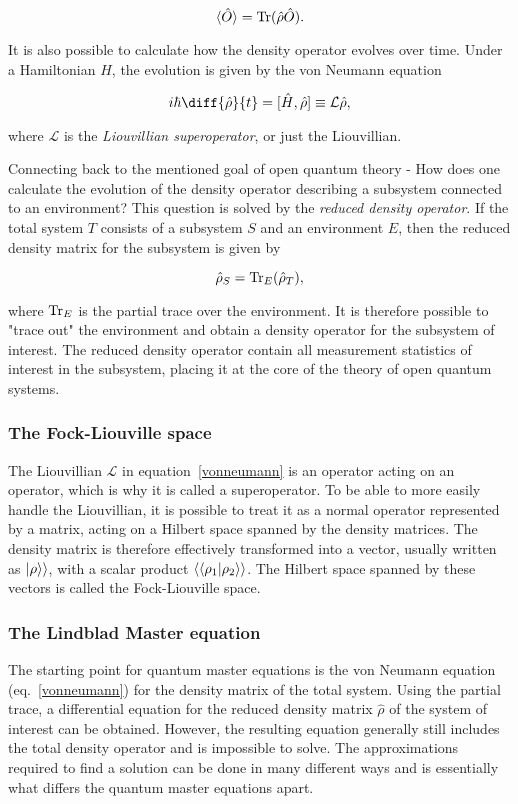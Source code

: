 \documentclass[../main.tex]{subfiles}
\begin{document}
\begin{equation}\label{exp}
    \braket{\hat O} = \operatorname{Tr}({\hat\rho \hat O}).
\end{equation}

It is also possible to calculate how the density operator evolves over time. Under a Hamiltonian $\hat H$, the evolution is given by the von Neumann equation

\begin{equation}\label{vonneumann}
    i\hbar\diff{\hat\rho}{t} = [\hat H, \hat\rho] \equiv \mathcal{L}\hat\rho,
\end{equation}

where $\mathcal{L}$ is the \textit{Liouvillian superoperator}, or just the Liouvillian. 

Connecting back to the mentioned goal of open quantum theory - How does one calculate the evolution of the density operator describing a subsystem connected to an environment? This question is solved by the \textit{reduced density operator}. If the total system $T$ consists of a subsystem $S$ and an environment $E$, then the reduced density matrix for the subsystem is given by

\begin{equation}
    \hat\rho_S = \operatorname{Tr}_E({\hat\rho_T}),
\end{equation}

where $\operatorname{Tr}_E$ is the partial trace over the environment. It is therefore possible to "trace out" the environment and obtain a density operator for the subsystem of interest. The reduced density operator contain all measurement statistics of interest in the subsystem, placing it at the core of the theory of open quantum systems.

\subsubsection{The Fock-Liouville space}
The Liouvillian $\mathcal{L}$ in equation~\eqref{vonneumann} is an operator acting on an operator, which is why it is called a superoperator. To be able to more easily handle the Liouvillian, it is possible to treat it as a normal operator represented by a matrix, acting on a Hilbert space spanned by the density matrices. The density matrix is therefore effectively transformed into a vector, usually written as $\ket{\rho}\rangle$, with a scalar product $\langle\braket{\rho_1|\rho_2}\rangle$. The Hilbert space spanned by these vectors is called the Fock-Liouville space.

\subsubsection{The Lindblad Master equation}\label{sec:lind}
The starting point for quantum master equations is the von Neumann equation (eq.~\eqref{vonneumann}) for the density matrix of the total system. Using the partial trace, a differential equation for the reduced density matrix $\hat\rho$ of the system of interest can be obtained. However, the resulting equation generally still includes the total density operator and is impossible to solve. The approximations required to find a solution can be done in many different ways and is essentially what differs the quantum master equations apart.
\end{document}

